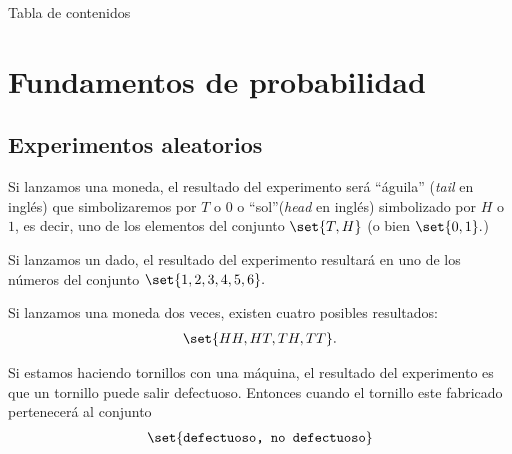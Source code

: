 
{Tabla de contenidos}
\tableofcontents


\section{Fundamentos de probabilidad}

\subsection{Experimentos aleatorios}

 \begin{exmp}
  \label{exmp:1.1}
  Si lanzamos una moneda, el resultado del experimento será ``águila'' (\emph{tail} en inglés) que simbolizaremos por $T$ o $0$ o ``sol''(\emph{head} en inglés) simbolizado por $H$ o $1$, es decir, uno de los elementos del conjunto $\set{T,H}$ (o bien $\set{0,1}.$)
 \end{exmp}



 \begin{exmp}
  \label{exmp:1.2}
  Si lanzamos un dado, el resultado del experimento resultará en uno de los números del conjunto $\set{1,2,3,4,5,6}.$
 \end{exmp}



 \begin{exmp}
  \label{exmp:1.3}
  Si lanzamos una moneda dos veces, existen cuatro posibles resultados:
  \begin{align*}
   \set{HH,HT,TH,TT}.
  \end{align*}

 \end{exmp}



 \begin{exmp}
  \label{exmp:1.4}
  Si estamos haciendo tornillos con una máquina, el resultado del experimento es que un tornillo puede salir defectuoso. Entonces cuando el tornillo este fabricado pertenecerá al conjunto
  \begin{align*}
   \set{\texttt{defectuoso, no defectuoso}}
  \end{align*}

 \end{exmp}



